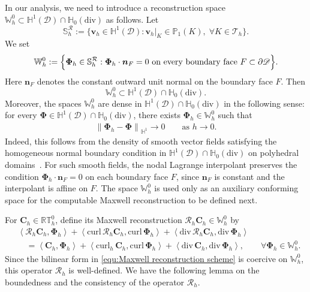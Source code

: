 \documentclass[11pt, reqno]{amsart}
\theoremstyle{definition}
\numberwithin{equation}{section}
\newcommand{\curl}{\mathrm{curl}\,}
\newcommand{\divg}{\mathrm{div}\,}
\newcommand{\bff}{\boldsymbol}
\newcommand{\bb}{\mathbb}
\newcommand{\norm}[2]{\left\|{#1}\right\|_{#2}}
\newcommand{\inpro}[2]{\left\langle#1,#2\right\rangle}
\newcommand{\hzerodiv}{\mathbb{H}_0(\mathrm{div})}
\newcommand{\curlh}{\mathrm{curl}_h\,}
\begin{document}
In our analysis, we need to introduce a reconstruction space $\bb{W}_h^0\subset\bb{H}^1(\mathscr{D})\cap\hzerodiv$ as follows. Let
\[
\bb{S}_h^{\mathcal R}:=\{\bff v_h\in \bb{H}^1(\mathscr D): \bff{v}_h|_K\in \mathbb P_1(K),\;\forall K\in\mathcal T_h\}.
\]
We set
\begin{align}\label{equ:Wh0 definition}
	\bb W_h^0
	:=
	\Bigl\{
	\bff\Phi_h\in \bb{S}_h^{\mathcal R}:
	\bff\Phi_h\cdot\bff n_F=0
	\text{ on every boundary face }F\subset\partial\mathscr D
	\Bigr\}.
\end{align}
Here $\bff n_F$ denotes the constant outward unit normal on the boundary face $F$. Then
\[
\bb W_h^0\subset \bb H^1(\mathscr D)\cap\hzerodiv.
\]
Moreover, the spaces $\bb W_h^0$ are dense in
$\bb H^1(\mathscr D)\cap\hzerodiv$ in the following sense: for every
$\bff\Phi\in\bb H^1(\mathscr D)\cap\hzerodiv$, there exists
$\bff\Phi_h\in\bb W_h^0$ such that
\begin{align}\label{equ:Wh0 approximation property}
	\norm{\bff\Phi_h-\bff\Phi}{\bb H^1}\to0
	\qquad\text{as }h\to0.
\end{align}
Indeed, this follows from the density of smooth vector fields satisfying the
homogeneous normal boundary condition in $\bb H^1(\mathscr D)\cap\hzerodiv$ on polyhedral domains~\cite{BauPau16}. For such smooth fields, the nodal Lagrange interpolant preserves the condition $\bff\Phi_h\cdot\bff n_F=0$ on each boundary face $F$, since $\bff n_F$ is constant and the interpolant is affine on $F$. The space $\bb W_h^0$ is
used only as an auxiliary conforming space for the computable Maxwell
reconstruction to be defined next.



For $\bff{C}_h\in\bb{RT}_h^0$, define its Maxwell reconstruction $\mathcal{R}_h\bff{C}_h\in\bb{W}_h^0$ by
\begin{align}\label{equ:Maxwell reconstruction scheme}
	&\inpro{\mathcal{R}_h\bff{C}_h}{\bff{\Phi}_h}
	+\inpro{\curl\mathcal{R}_h\bff{C}_h}{\curl\bff{\Phi}_h}
	+\inpro{\divg\mathcal{R}_h\bff{C}_h}{\divg\bff{\Phi}_h}
	\nonumber\\
	&\quad
	=
	\inpro{\bff{C}_h}{\bff{\Phi}_h}
	+\inpro{\curlh\bff{C}_h}{\curl\bff{\Phi}_h}
	+\inpro{\divg\bff{C}_h}{\divg\bff{\Phi}_h},
	\qquad
	\forall \bff{\Phi}_h\in\bb{W}_h^0.
\end{align}
Since the bilinear form in \eqref{equ:Maxwell reconstruction scheme} is coercive on $\bb{W}_h^0$, this operator $\mathcal{R}_h$ is well-defined.
We have the following lemma on the boundedness and the consistency of the operator $\mathcal R_h$.
\end{document}
